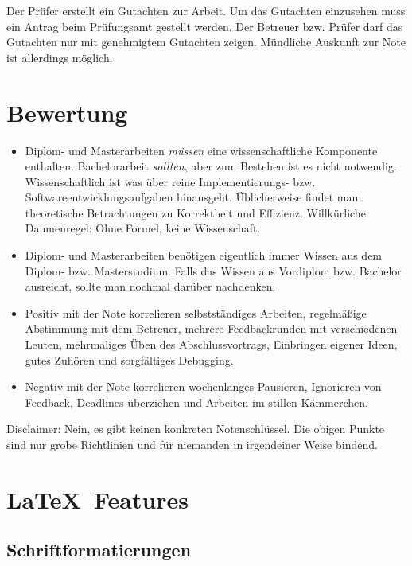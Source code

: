 Der Prüfer erstellt ein Gutachten zur Arbeit.
Um das Gutachten einzusehen muss ein Antrag beim Prüfungsamt gestellt werden.
Der Betreuer bzw. Prüfer darf das Gutachten nur mit genehmigtem Gutachten zeigen.
Mündliche Auskunft zur Note ist allerdings möglich.

\section{Bewertung}

\begin{itemize}
  \item Diplom- und Masterarbeiten \emph{müssen} eine wissenschaftliche Komponente enthalten.
    Bachelorarbeit \emph{sollten}, aber zum Bestehen ist es nicht notwendig.
    Wissenschaftlich ist was über reine Implementierungs- bzw. Softwareentwicklungsaufgaben hinausgeht.
    Üblicherweise findet man theoretische Betrachtungen zu Korrektheit und Effizienz.
    Willkürliche Daumenregel: Ohne Formel, keine Wissenschaft.
  \item Diplom- und Masterarbeiten benötigen eigentlich immer Wissen aus dem Diplom- bzw. Masterstudium.
    Falls das Wissen aus Vordiplom bzw. Bachelor ausreicht,
    sollte man nochmal darüber nachdenken.
  \item Positiv mit der Note korrelieren
    selbstständiges Arbeiten,
    regelmäßige Abstimmung mit dem Betreuer,
    mehrere Feedbackrunden mit verschiedenen Leuten,
    mehrmaliges Üben des Abschlussvortrags,
    Einbringen eigener Ideen,
    gutes Zuhören
    und sorgfältiges Debugging.
  \item Negativ mit der Note korrelieren
    wochenlanges Pausieren,
    Ignorieren von Feedback,
    Deadlines überziehen
    und Arbeiten im stillen Kämmerchen.
\end{itemize}

Disclaimer:
Nein, es gibt keinen konkreten Notenschlüssel.
Die obigen Punkte sind nur grobe Richtlinien und für niemanden in irgendeiner Weise bindend.

\section{\LaTeX\ Features}

\subsection{Schriftformatierungen}

